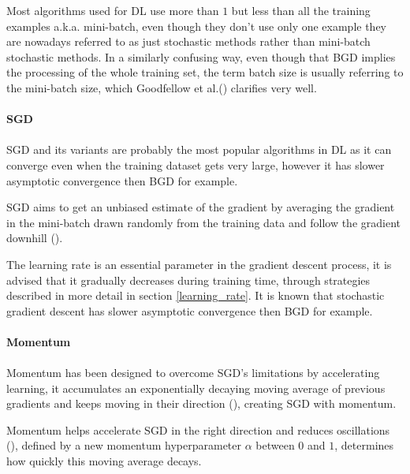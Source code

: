 Most algorithms used for \gls{DL} use more than $1$ but less than all the training examples \gls{a.k.a.} mini-batch, even though they don't use only one example they are nowadays referred to as just stochastic methods rather than mini-batch stochastic methods. In a similarly confusing way, even though that \gls{BGD} implies the processing of the whole training set, the term batch size is usually referring to the mini-batch size, which Goodfellow et al.(\cite{GoodBengCour16}) clarifies very well.
\paragraph{\gls{SGD}}
\paragraph{}
\gls{SGD} and its variants are probably the most popular algorithms in \gls{DL} as it can converge even when the training dataset gets very large, however it has slower asymptotic convergence then \gls{BGD} for example.

\gls{SGD} aims to get an unbiased estimate of the gradient by averaging the gradient in the mini-batch drawn randomly from the training data and follow the gradient downhill (\cite{GoodBengCour16}).

The learning rate is an essential parameter in the gradient descent process, it is advised that it gradually decreases during training time, through strategies described in more detail in section \ref{learning_rate}. It is known that stochastic gradient descent has slower asymptotic convergence then \gls{BGD} for example.
\paragraph{Momentum}
\paragraph{}
Momentum has been designed to overcome \gls{SGD}'s limitations by accelerating learning, it accumulates an exponentially decaying moving average of previous gradients and keeps moving in their direction (\cite{GoodBengCour16}), creating \gls{SGD} with momentum. 

Momentum helps accelerate \gls{SGD} in the right direction and reduces oscillations (\cite{ruder2017overview}), defined by a new momentum hyperparameter $\alpha$ between $0$ and $1$, determines how quickly this moving average decays.

